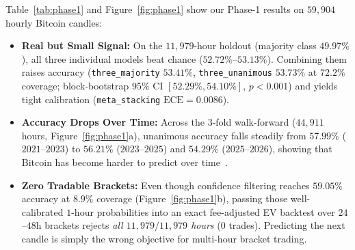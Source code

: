 \documentclass{article}
\begin{document}
Table~\ref{tab:phase1} and Figure~\ref{fig:phase1} show our Phase-1 results on $59{,}904$ hourly Bitcoin candles:
\begin{itemize}
    \item \textbf{Real but Small Signal:} On the $11{,}979$-hour holdout (majority class $49.97\%$), all three individual models beat chance ($52.72\%$--$53.13\%$). Combining them raises accuracy (\texttt{three\_majority} $53.41\%$, \texttt{three\_unanimous} $53.73\%$ at $72.2\%$ coverage; block-bootstrap $95\%$ CI $[52.29\%, 54.10\%]$, $p < 0.001$) and yields tight calibration (\texttt{meta\_stacking} $\mathrm{ECE} = 0.0086$).
    \item \textbf{Accuracy Drops Over Time:} Across the $3$-fold walk-forward ($44{,}911$ hours, Figure~\ref{fig:phase1}a), unanimous accuracy falls steadily from $57.99\%$ ($2021$--$2023$) to $56.21\%$ ($2023$--$2025$) and $54.29\%$ ($2025$--$2026$), showing that Bitcoin has become harder to predict over time~\citep{Bustos2025}.
    \item \textbf{Zero Tradable Brackets:} Even though confidence filtering reaches $59.05\%$ accuracy at $8.9\%$ coverage (Figure~\ref{fig:phase1}b), passing those well-calibrated $1$-hour probabilities into an exact fee-adjusted EV backtest over $24$--$48$h brackets rejects \emph{all $11{,}979 / 11{,}979$ hours} ($0$ trades). Predicting the next candle is simply the wrong objective for multi-hour bracket trading.
\end{itemize}
\end{document}
